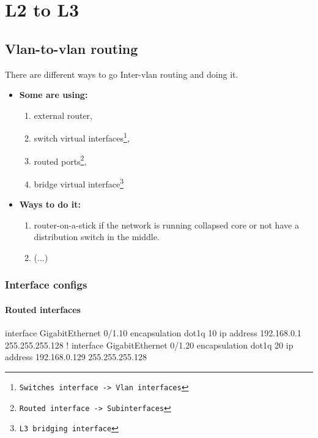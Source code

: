 \chapter{L2 to L3}

\section{Vlan-to-vlan routing}


There are different ways to go  Inter-vlan routing and doing it.

\begin{itemize}
    \item \textbf{Some are using:}
    \begin{enumerate}
        \item external router,
        \item switch virtual interfaces\footnote{\texttt{Switches interface -> Vlan interfaces}},
        \item routed ports\footnote{\texttt{Routed interface -> Subinterfaces}},
        \item bridge virtual interface\footnote{\texttt{L3 bridging interface}}
    \end{enumerate}
    \item \textbf{Ways to do it:}
    \begin{enumerate}
        \item router-on-a-stick if the network is running collapsed core or not have a distribution switch in the middle.
        \item (...)
    \end{enumerate}
\end{itemize}

\pagebreak

\subsection{Interface configs}

\subsubsection{Routed interfaces}

\begin{txt}
    interface GigabitEthernet 0/1.10
    encapsulation dot1q 10
    ip address 192.168.0.1 255.255.255.128
    !
    interface GigabitEthernet 0/1.20
    encapsulation dot1q 20
    ip address 192.168.0.129 255.255.255.128
\end{txt}

